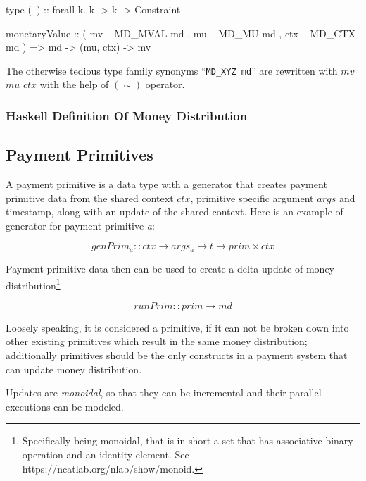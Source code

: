 \begin{code}
    type (~) :: forall k. k -> k -> Constraint

    monetaryValue :: ( mv  ~ MD_MVAL md
                     , mu  ~ MD_MU md
                     , ctx ~ MD_CTX md
                     )
                  => md -> (mu, ctx) -> mv
\end{code}

The otherwise tedious type family synonyms ``\texttt{MD_XYZ md}'' are rewritten with $mv$
$mu$ $ctx$ with the help of $(\sim)$ operator.

\subsubsection{Haskell Definition Of Money Distribution}



\subsection{Payment Primitives}

A payment primitive is a data type with a generator that creates payment primitive data from the
shared context $ctx$, primitive specific argument $args$ and timestamp, along with an update of the
shared context. Here is an example of generator for payment primitive \textit{a}:

\begin{equation}
    genPrim_a :: ctx \rightarrow args_a \rightarrow t \rightarrow prim \times ctx
\end{equation}

Payment primitive data then can be used to create a delta update of money
distribution\footnote{Specifically being monoidal, that is in short a set that has associative
binary operation and an identity element. See https://ncatlab.org/nlab/show/monoid.}

\begin{equation}
    runPrim :: prim \rightarrow md
\end{equation}

Loosely speaking, it is considered a primitive, if it can not be broken down into other existing
primitives which result in the same money distribution; additionally primitives should be the only
constructs in a payment system that can update money distribution.

Updates are \textit{monoidal}, so that they can be incremental and their parallel executions can be
modeled.

